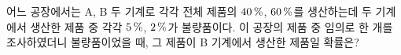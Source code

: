 어느 공장에서는 A, B 두 기계로 각각 전체 제품의 $40\mkern3mu \%$, $60\mkern3mu \%$를 생산하는데 두 기계에서 생산한 제품 중 각각 $5\mkern3mu \%$, $2\mkern3mu \%$가 불량품이다. 이 공장의 제품 중 임의로 한 개를 조사하였더니 불량품이었을 때, 그 제품이 B 기계에서 생산한 제품일 확률은?
